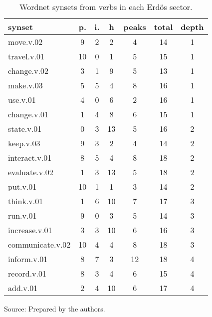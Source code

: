 \begin{table}[h!]
\begin{center}
\caption{Wordnet synsets from verbs in each Erd\"os sector.}
\begin{tabular}{| l || c | c | c || c | c | c |}\hline
{\bf synset} & {\bf p.} & {\bf i.} & {\bf h} & {\bf peaks} & {\bf total} & {\bf depth} \\\hline\hline
move.v.02 & 9  & 2  & 2  & 4  & 14  & 1 \\
travel.v.01 & 10  & 0  & 1  & 5  & 15  & 1 \\
change.v.02 & 3  & 1  & 9  & 5  & 13  & 1 \\
make.v.03 & 5  & 5  & 4  & 8  & 16  & 1 \\
use.v.01 & 4  & 0  & 6  & 2  & 16  & 1 \\
change.v.01 & 1  & 4  & 8  & 6  & 15  & 1 \\\hline
state.v.01 & 0  & 3  & 13  & 5  & 16  & 2 \\
keep.v.03 & 9  & 3  & 2  & 4  & 14  & 2 \\
interact.v.01 & 8  & 5  & 4  & 8  & 18  & 2 \\
evaluate.v.02 & 1  & 3  & 13  & 5  & 18  & 2 \\
put.v.01 & 10  & 1  & 1  & 3  & 14  & 2 \\\hline
think.v.01 & 1  & 6  & 10  & 7  & 17  & 3 \\
run.v.01 & 9  & 0  & 3  & 5  & 14  & 3 \\
increase.v.01 & 3  & 3  & 10  & 6  & 16  & 3 \\
communicate.v.02 & 10  & 4  & 4  & 8  & 18  & 3 \\\hline
inform.v.01 & 8  & 7  & 3  & 12  & 18  & 4 \\
record.v.01 & 8  & 3  & 4  & 6  & 15  & 4 \\
add.v.01 & 2  & 4  & 10  & 6  & 17  & 4 \\\hline
\end{tabular}
\begin{flushleft}
		Source: Prepared by the authors.\
\end{flushleft}
\end{center}
\end{table}
